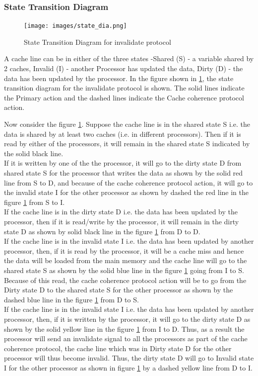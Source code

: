 \documentclass[12pt]{article}
\begin{document}
\subsubsection{State Transition Diagram}
\begin{figure}[H]
    \centering
    \texttt{[image: images/state\_dia.png]}
    \caption{State Transition Diagram for invalidate protocol}
    \label{fig:state_transition}
\end{figure}
A cache line can be in either of the three states -Shared (S) - a variable shared by 2 caches,
Invalid (I) - another Processor has updated the data, Dirty (D) - the data has been updated by the processor.
In the figure shown in \ref{fig:state_transition}, the state transition diagram for the invalidate protocol is shown.
The solid lines indicate the Primary action and the dashed lines indicate the Cache coherence protocol action.

Now consider the figure \ref{fig:state_transition}. Suppose the cache line is in the shared state S i.e. the data is shared by at least two caches (i.e. in different processors).
Then if it is read by either of the processors, it will remain in the shared state S indicated by the solid black line. \\
If it is written by one of the the processor, it will go to the dirty state D from shared 
state S for the processor that writes the data as shown by the solid red line from S to D, and because of the cache coherence protocol action, it will go to the invalid state I for the other processor as shown by dashed the red line in the
figure \ref{fig:state_transition} from S to I. \\
If the cache line is in the dirty state D i.e. the data has been updated by the processor, then if it is read/write by the processor, it will remain in the dirty state D as shown by solid black line in the figure \ref{fig:state_transition} from D to D.\\
If the cache line is in the invalid state I i.e. the data has been updated by another processor, then, if it is read by the processor, it will 
be a cache miss and hence the data will be loaded from the main memory and the cache line will go to the shared state S as shown by the solid blue line in the figure \ref{fig:state_transition} going from I to S.
Because of this read, the cache coherence protocol action will be to go from the Dirty state D to the shared state S for the other processor as shown by the dashed blue line in the figure \ref{fig:state_transition} from D to S.\\
If the cache line is in the invalid state I i.e. the data has been updated by another processor, then, if it is written by the processor, it will go to the dirty state D as shown by the solid yellow line in the figure \ref{fig:state_transition} from I to D.
Thus, as a result the processor will send an invalidate signal to all the processors as part of the cache coherence protocol, the cache line which was in Dirty state D for the other processor
will thus become invalid. Thus, the dirty state D will go to Invalid state I for the other processor as shown in figure \ref{fig:state_transition} by a dashed yellow line from D to I. \\
\end{document}
